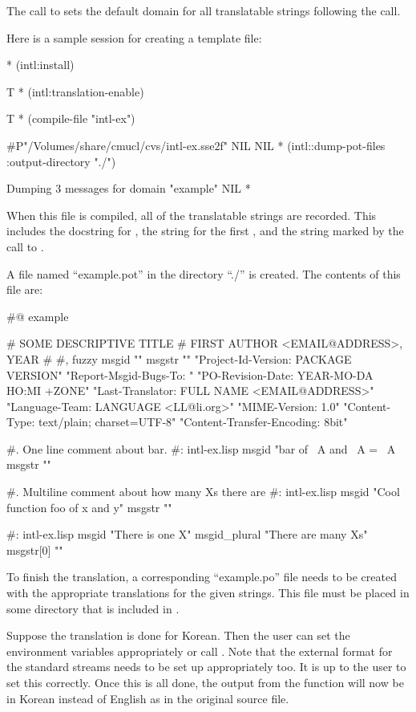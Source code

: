 The call to  sets the default domain for all
translatable strings following the call.

Here is a sample session for creating a template file:

\begin{example}
* (intl:install)

T
* (intl:translation-enable)

T
* (compile-file "intl-ex")

#P"/Volumes/share/cmucl/cvs/intl-ex.sse2f"
NIL
NIL
* (intl::dump-pot-files :output-directory "./")

Dumping 3 messages for domain "example"
NIL
*
\end{example}

When this file is compiled, all of the translatable strings are
recorded.  This includes the docstring for , the string for
the first , and the string marked by the call to
.

A file named ``example.pot'' in the directory ``./'' is created.
The contents of this file are:
\begin{example}
#@ example

# SOME DESCRIPTIVE TITLE
# FIRST AUTHOR <EMAIL@ADDRESS>, YEAR
#
#, fuzzy
msgid ""
msgstr ""
"Project-Id-Version: PACKAGE VERSION"
"Report-Msgid-Bugs-To: "
"PO-Revision-Date: YEAR-MO-DA HO:MI +ZONE"
"Last-Translator: FULL NAME <EMAIL@ADDRESS>"
"Language-Team: LANGUAGE <LL@li.org>"
"MIME-Version: 1.0"
"Content-Type: text/plain; charset=UTF-8"
"Content-Transfer-Encoding: 8bit"

#.  One line comment about bar.
#: intl-ex.lisp
msgid "bar of ~A and ~A = ~A~%
msgstr ""

#.  Multiline comment about
    how many Xs there are
#: intl-ex.lisp
msgid "Cool function foo of x and y"
msgstr ""

#: intl-ex.lisp
msgid "There is one X"
msgid_plural "There are many Xs"
msgstr[0] ""

\end{example}

To finish the translation, a corresponding ``example.po'' file needs
to be created with the appropriate translations for the given
strings.  This file must be placed in some directory that is included
in .

Suppose the translation is done for Korean.  Then the user can set the
environment variables appropriately or call .  Note that the external format for the standard streams
needs to be set up appropriately too.  It is up to the user to set
this correctly.  Once this is all done, the output from the function
 will now be in Korean instead of English as in the original
source file.

